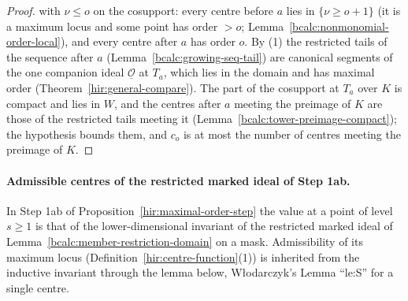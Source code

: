 \begin{proof}
with \(\nu\le o\) on the cosupport: every centre before \(a\) lies in \(\{\nu\ge o+1\}\) (it is a maximum locus and some point has order \(>o\);
Lemma~\ref{bcalc:nonmonomial-order-local}), and every centre after \(a\) has order \(o\). By (1) the restricted tails of the sequence after \(a\)
(Lemma~\ref{bcalc:growing-seq-tail}) are canonical segments of the one companion ideal \(\underline{\mathcal O}\) at \(T_a\), which lies in the domain and has maximal order
(Theorem~\ref{hir:general-compare}). The part of the cosupport at \(T_a\) over \(K\) is compact and lies in \(W\), and the centres after \(a\) meeting the preimage of \(K\) are
those of the restricted tails meeting it (Lemma~\ref{bcalc:tower-preimage-compact}); the hypothesis bounds them, and \(c_o\) is at most the number of centres meeting the
preimage of \(K\).
\end{proof}

\paragraph{Admissible centres of the restricted marked ideal of Step 1ab.} In Step 1ab of Proposition~\ref{hir:maximal-order-step} the value at a
point of level \(s\ge1\) is that of the lower-dimensional invariant of the restricted marked ideal of Lemma~\ref{bcalc:member-restriction-domain} on a mask.
Admissibility of its maximum locus (Definition~\ref{hir:centre-function}(1)) is inherited from the inductive invariant through the lemma below, Włodarczyk's
Lemma ``le:S'' for a single centre.

